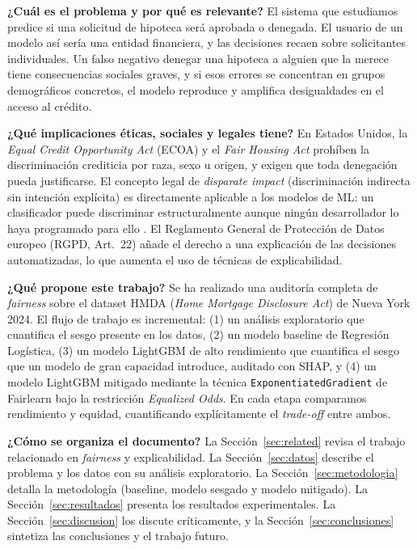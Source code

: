 \documentclass[11pt,a4paper]{article}
\begin{document}
\textbf{¿Cuál es el problema y por qué es relevante?} El sistema que estudiamos predice si una
solicitud de hipoteca será aprobada o denegada. El usuario de un modelo así sería una entidad
financiera, y las decisiones recaen sobre solicitantes individuales. Un falso negativo denegar
una hipoteca a alguien que la merece tiene consecuencias sociales graves, y si esos errores se
concentran en grupos demográficos concretos, el modelo reproduce y amplifica desigualdades en el acceso al crédito.

\textbf{¿Qué implicaciones éticas, sociales y legales tiene?} En Estados Unidos, la \textit{Equal
Credit Opportunity Act} (ECOA) y el \textit{Fair Housing Act} prohíben la discriminación crediticia
por raza, sexo u origen, y exigen que toda denegación pueda justificarse. El concepto legal de
\textit{disparate impact} (discriminación indirecta sin intención explícita) es directamente
aplicable a los modelos de ML: un clasificador puede discriminar estructuralmente aunque ningún
desarrollador lo haya programado para ello \cite{barocas2016}. El Reglamento General de Protección
de Datos europeo (RGPD, Art.~22) añade el derecho a una explicación de las decisiones automatizadas,
lo que aumenta el uso de técnicas de explicabilidad.

\textbf{¿Qué propone este trabajo?} Se ha realizado una auditoría completa de \textit{fairness} sobre el
dataset HMDA (\textit{Home Mortgage Disclosure Act}) de Nueva York 2024. El flujo de trabajo es
incremental: (1) un análisis exploratorio que cuantifica el sesgo presente en los datos, (2) un
modelo baseline de Regresión Logística, (3) un modelo LightGBM de alto rendimiento que cuantifica
el sesgo que un modelo de gran capacidad introduce, auditado con SHAP, y (4) un modelo LightGBM
mitigado mediante la técnica \texttt{ExponentiatedGradient} de Fairlearn bajo la restricción
\textit{Equalized Odds}. En cada etapa comparamos rendimiento y equidad, cuantificando explícitamente
el \textit{trade-off} entre ambos.

\textbf{¿Cómo se organiza el documento?} La Sección~\ref{sec:related} revisa el trabajo relacionado
en \textit{fairness} y explicabilidad. La Sección~\ref{sec:datos} describe el problema y los datos
con su análisis exploratorio. La Sección~\ref{sec:metodologia} detalla la metodología (baseline,
modelo sesgado y modelo mitigado). La Sección~\ref{sec:resultados} presenta los resultados
experimentales. La Sección~\ref{sec:discusion} los discute críticamente, y la
Sección~\ref{sec:conclusiones} sintetiza las conclusiones y el trabajo futuro.
\end{document}
